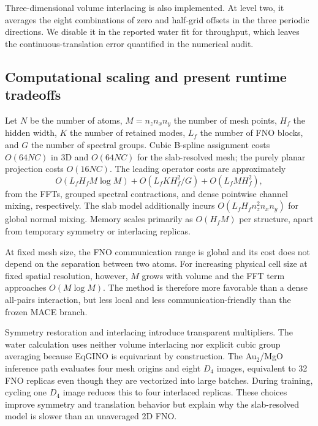 \documentclass[11pt]{article}
\begin{document}
Three-dimensional volume interlacing is also implemented. At level two, it
averages the eight combinations of zero and half-grid offsets in the three
periodic directions. We disable it in the reported water fit for throughput,
which leaves the continuous-translation error quantified in the numerical
audit.

\subsection{Computational scaling and present runtime tradeoffs}

Let \(N\) be the number of atoms, \(M=n_zn_xn_y\) the number of mesh points,
\(H_f\) the hidden width, \(K\) the number of retained modes, \(L_f\) the
number of FNO blocks, and \(G\) the number of spectral groups. Cubic B-spline
assignment costs \(O(64NC)\) in 3D and \(O(64NC)\) for the slab-resolved mesh;
the purely planar projection costs \(O(16NC)\). The leading operator costs are
approximately
\begin{equation}
 O(L_fH_fM\log M)
 +O(L_fKH_f^2/G)
 +O(L_fMH_f^2),
 \label{eq:fno-cost}
\end{equation}
from the FFTs, grouped spectral contractions, and dense pointwise channel
mixing, respectively. The slab model additionally incurs
\(O(L_fH_fn_z^2n_xn_y)\) for global normal mixing. Memory scales primarily as
\(O(H_fM)\) per structure, apart from temporary symmetry or interlacing
replicas.

At fixed mesh size, the FNO communication range is global and its cost does
not depend on the separation between two atoms. For increasing physical cell
size at fixed spatial resolution, however, \(M\) grows with volume and the FFT
term approaches \(O(M\log M)\). The method is therefore more favorable than a
dense all-pairs interaction, but less local and less communication-friendly
than the frozen MACE branch.

Symmetry restoration and interlacing introduce transparent multipliers. The
water calculation uses neither volume interlacing nor explicit cubic group
averaging because EqGINO is equivariant by construction. The Au$_2$/MgO
inference path evaluates four mesh origins and eight \(D_4\) images, equivalent
to 32 FNO replicas even though they are vectorized into large batches. During
training, cycling one \(D_4\) image reduces this to four interlaced replicas.
These choices improve symmetry and translation behavior but explain why the
slab-resolved model is slower than an unaveraged 2D FNO.
\end{document}
